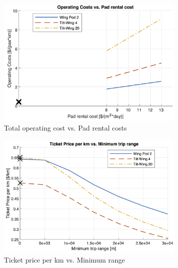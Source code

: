 \begin{figure}[h]
\begin{subfigure}[t]{0.33\textwidth}
    \centering
    \includegraphics[width=\textwidth]{Figures/cost_oper.png}
    \captionsetup{justification=centering}
    \caption{Total operating cost vs. Pad rental costs}
    \label{fig:sens01}
\end{subfigure}
\begin{subfigure}[t]{0.33\textwidth}
    \centering
    \includegraphics[width=\textwidth]{Figures/minRange_TPrice_perkmNOPAD.png}
    \captionsetup{justification=centering}
    \caption{Ticket price per km vs. Minimum range}
    \label{fig:sens02}
\end{subfigure}
\begin{subfigure}[t]{0.33\textwidth}
    \centering

\end{subfigure}
\end{figure}
